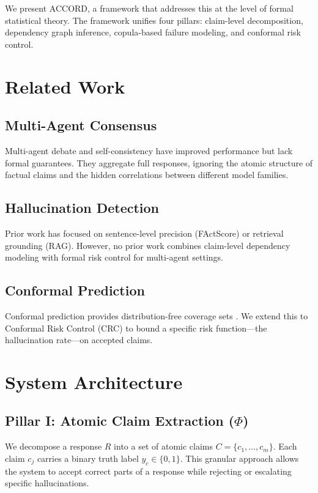 \documentclass[conference]{IEEEtran}
\begin{document}
We present ACCORD, a framework that addresses this at the level of formal statistical theory. The framework unifies four pillars: claim-level decomposition, dependency graph inference, copula-based failure modeling, and conformal risk control.

\section{Related Work}
\subsection{Multi-Agent Consensus}
Multi-agent debate \cite{b2} and self-consistency \cite{b3} have improved performance but lack formal guarantees. They aggregate full responses, ignoring the atomic structure of factual claims and the hidden correlations between different model families.

\subsection{Hallucination Detection}
Prior work has focused on sentence-level precision (FActScore) or retrieval grounding (RAG). However, no prior work combines claim-level dependency modeling with formal risk control for multi-agent settings.

\subsection{Conformal Prediction}
Conformal prediction provides distribution-free coverage sets \cite{b1}. We extend this to Conformal Risk Control (CRC) to bound a specific risk function—the hallucination rate—on accepted claims.

\section{System Architecture}

\subsection{Pillar I: Atomic Claim Extraction ($\Phi$)}
We decompose a response $R$ into a set of atomic claims $C = \{c_1, \dots, c_m\}$. Each claim $c_j$ carries a binary truth label $y_c \in \{0,1\}$. This granular approach allows the system to accept correct parts of a response while rejecting or escalating specific hallucinations.
\end{document}
